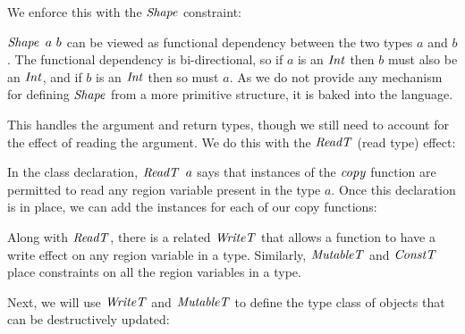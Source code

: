 We enforce this with the $\operatorname{\mathit{Shape}}$ constraint:


$\operatorname{\mathit{Shape}} \ a \ b$ can be viewed as functional dependency \cite{jones:functional-dependencies} between the two types $a$ and $b$. The functional dependency is bi-directional, so if $a$ is an $\operatorname{\mathit{Int}}$ then $b$ must also be an $\operatorname{\mathit{Int}}$, and if $b$ is an $\operatorname{\mathit{Int}}$ then so must $a$. As we do not provide any mechanism for defining $\operatorname{\mathit{Shape}}$ from a more primitive structure, it is baked into the language. 

This handles the argument and return types, though we still need to account for the effect of reading the argument. We do this with the $\operatorname{\mathit{ReadT}}$ (read type) effect:


In the class declaration, $\iReadT \ a$ says that instances of the $\operatorname{\mathit{copy}}$ function are permitted to read any region variable present in the type $a$. Once this declaration is in place, we can add the instances for each of our copy functions:


Along with $\operatorname{\mathit{ReadT}}$, there is a related $\operatorname{\mathit{WriteT}}$ that allows a function to have a write effect on any region variable in a type. Similarly, $\operatorname{\mathit{MutableT}}$ and $\operatorname{\mathit{ConstT}}$ place constraints on all the region variables in a type. 

Next, we will use $\operatorname{\mathit{WriteT}}$ and $\operatorname{\mathit{MutableT}}$ to define the type class of objects that can be destructively updated:


